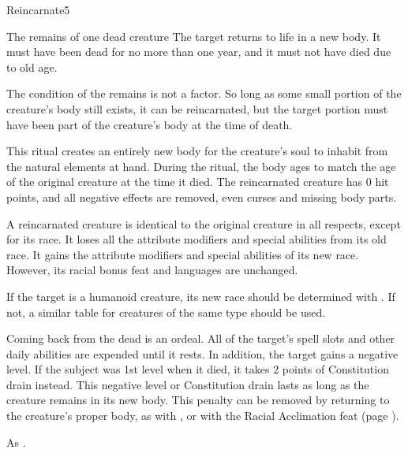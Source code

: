 \begin{spellsection}{Reincarnate}{5}
\begin{spelltarget}{The remains of one dead creature}
    \spelleffect The target returns to life in a new body. It must have been dead for no more than one year, and it must not have died due to old age.

    The condition of the remains is not a factor. So long as some small portion of the creature's body still exists, it can be reincarnated, but the target portion must have been part of the creature's body at the time of death.

    This ritual creates an entirely new body for the creature's soul to inhabit from the natural elements at hand. During the ritual, the body ages to match the age of the original creature at the time it died. The reincarnated creature has 0 hit points, and all negative effects are removed, even curses and missing body parts.

    A reincarnated creature is identical to the original creature in all respects, except for its race. It loses all the attribute modifiers and special abilities from its old race. It gains the attribute modifiers and special abilities of its new race. However, its racial bonus feat and languages are unchanged.

    If the target is a humanoid creature, its new race should be determined with . If not, a similar table for creatures of the same type should be used.

    Coming back from the dead is an ordeal. All of the target's spell slots and other daily abilities are expended until it rests. In addition, the target gains a negative level. If the subject was 1st level when it died, it takes 2 points of Constitution drain instead. This negative level or Constitution drain lasts as long as the creature remains in its new body. This penalty can be removed by returning to the creature's proper body, as with , or with the Racial Acclimation feat (page ).
\end{spelltarget}

\spellnotes As .


\end{spellsection}
